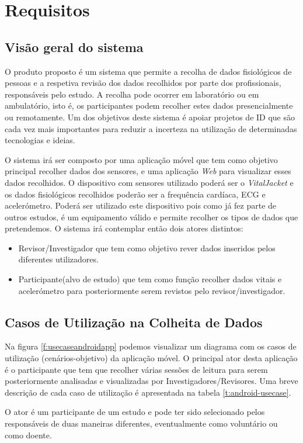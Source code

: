 \chapter{Requisitos}

\section{Visão geral do sistema}
O produto proposto é um sistema que permite a recolha de dados fisiológicos de pessoas e a respetiva revisão dos dados recolhidos por parte dos profissionais, responsáveis pelo estudo. A recolha pode ocorrer em laboratório ou em ambulatório, isto é, os participantes podem recolher estes dados presencialmente ou remotamente. Um dos objetivos deste sistema é apoiar projetos de \gls{ID} que são cada vez mais importantes para reduzir a incerteza na utilização de determinadas tecnologias e ideias.
\par 
O sistema irá ser composto por uma aplicação móvel que tem como objetivo principal recolher dados dos sensores, e uma aplicação \textit{Web} para visualizar esses dados recolhidos. O dispositivo com sensores utilizado poderá ser o \textit{VitalJacket} e os dados fisiológicos recolhidos poderão ser a frequência cardíaca, \gls{ECG} e acelerómetro. Poderá ser utilizado este dispositivo pois como já fez parte de outros estudos, é um equipamento válido e permite recolher os tipos de dados que pretendemos. O sistema irá contemplar então dois atores distintos:
\begin{itemize}
  \item Revisor/Investigador que tem como objetivo rever dados inseridos pelos diferentes utilizadores.
  \item Participante(alvo de estudo) que tem como função recolher dados vitais e acelerómetro para posteriormente serem revistos pelo revisor/investigador.
\end{itemize}
\newpage
\section{Casos de Utilização na Colheita de Dados}

Na figura \ref{f:usecaseandroidapp} podemos visualizar um diagrama com os casos de utilização (cenários-objetivo) da aplicação móvel. O principal ator desta aplicação é o participante que tem que recolher várias sessões de leitura para serem posteriormente analisadas e visualizadas por Investigadores/Revisores.  Uma breve descrição de cada caso de utilização é apresentada na tabela \ref{t:android-usecase}.
\par
O ator é um participante de um estudo e pode ter sido selecionado pelos responsáveis de duas maneiras diferentes, eventualmente como voluntário ou como doente. 

